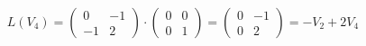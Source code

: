 \documentclass[12pt]{article}
\begin{document}
\begin{sloppypar}
    \[
        L(V_4) = \begin{pmatrix} 0 & -1 \\ -1 & 2 \end{pmatrix} \cdot \begin{pmatrix} 0 & 0 \\ 0 & 1 \end{pmatrix}
        = \begin{pmatrix}
            0 & -1 \\
            0 & 2
        \end{pmatrix}
        = -V_2 + 2V_4
    \]


\end{sloppypar}
\end{document}
